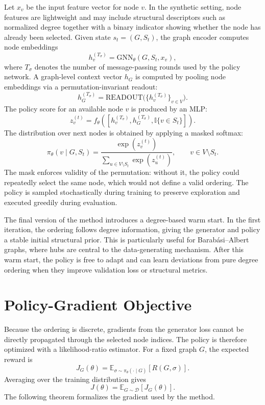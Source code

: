 Let $x_v$ be the input feature vector for node $v$. In the synthetic setting, node features are lightweight and may include structural descriptors such as normalized degree together with a binary indicator showing whether the node has already been selected. Given state $s_t=(G,S_t)$, the graph encoder computes node embeddings
\begin{equation}
    h_v^{(T_\sigma)} = \mathrm{GNN}_\theta(G,S_t,x_v),
\end{equation}
where $T_\sigma$ denotes the number of message-passing rounds used by the policy network. A graph-level context vector $h_G$ is computed by pooling node embeddings via a permutation-invariant readout:
\begin{equation}
    h_G^{(T_\sigma)} = \mathrm{READOUT}\bigl(\{h_v^{(T_\sigma)}\}_{v\in V}\bigr).
\end{equation}
The policy score for an available node $v$ is produced by an MLP:
\begin{equation}
    z_v^{(t)} = f_\theta\!\left([h_v^{(T_\sigma)}, h_G^{(T_\sigma)}, \mathbb{I}\{v\in S_t\}]\right).
\end{equation}
The distribution over next nodes is obtained by applying a masked softmax:
\begin{equation}
    \pi_\theta(v\mid G,S_t)
    = \frac{\exp(z_v^{(t)})}{\sum_{u\in V\setminus S_t}\exp(z_u^{(t)})},
    \qquad v\in V\setminus S_t.
\end{equation}
The mask enforces validity of the permutation: without it, the policy could repeatedly select the same node, which would not define a valid ordering. The policy is sampled stochastically during training to preserve exploration and executed greedily during evaluation.

The final version of the method introduces a degree-based warm start. In the first iteration, the ordering follows degree information, giving the generator and policy a stable initial structural prior. This is particularly useful for Barab\'asi--Albert graphs, where hubs are central to the data-generating mechanism. After this warm start, the policy is free to adapt and can learn deviations from pure degree ordering when they improve validation loss or structural metrics.

\section{Policy-Gradient Objective}
\label{sec:rl-policy-gradient}

Because the ordering is discrete, gradients from the generator loss cannot be directly propagated through the selected node indices. The policy is therefore optimized with a likelihood-ratio estimator. For a fixed graph $G$, the expected reward is
\begin{equation}
    J_G(\theta)=\mathbb{E}_{\sigma\sim\pi_\theta(\cdot\mid G)}[R(G,\sigma)].
\end{equation}
Averaging over the training distribution gives
\begin{equation}
    J(\theta)=\mathbb{E}_{G\sim\mathcal{D}}\left[J_G(\theta)\right].
\end{equation}
The following theorem formalizes the gradient used by the method.

